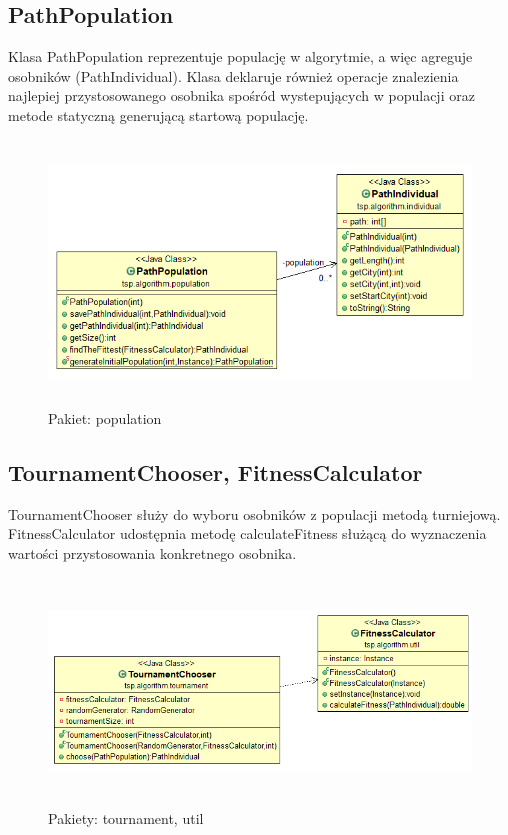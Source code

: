 \documentclass[a4paper,11pt]{article}
\begin{document}
\subsection{PathPopulation}

Klasa PathPopulation reprezentuje populację w algorytmie, a więc agreguje osobników (PathIndividual). Klasa deklaruje również operacje znalezienia najlepiej przystosowanego osobnika spośród wystepujących w populacji oraz metode statyczną generującą startową populację.

\begin{figure}[H]
\centering
\includegraphics[height=7cm]{population.PNG}
\caption{Pakiet: population}
\end{figure}

\subsection{TournamentChooser, FitnessCalculator }

TournamentChooser służy do wyboru osobników z populacji metodą turniejową. FitnessCalculator udostępnia metodę calculateFitness służącą do wyznaczenia wartości przystosowania konkretnego osobnika.

\begin{figure}[H]
\centering
\includegraphics[height=6cm]{util.PNG}
\caption{Pakiety: tournament, util}
\end{figure}
\end{document}
